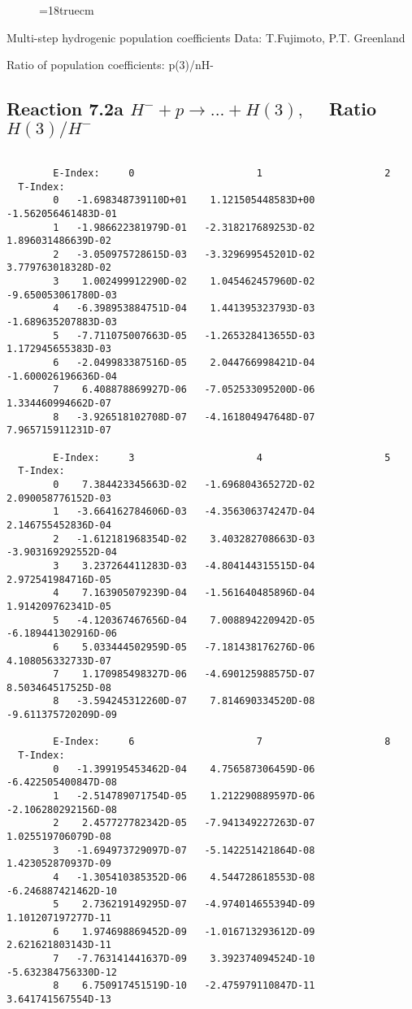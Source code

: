 \begin{figure} \label{2.2.14d}
\epsfxsize=18truecm
\end{figure}
\newpage

 Multi-step hydrogenic population coefficients
 Data: T.Fujimoto, P.T. Greenland

 Ratio of population coefficients: p(3)/nH-

\subsection{
Reaction 7.2a $ H^- + p \rightarrow ...+ H(3) , \quad  $
Ratio $H(3)/H^- $
}

\begin{verbatim}

        E-Index:     0                     1                     2
  T-Index:
        0   -1.698348739110D+01    1.121505448583D+00   -1.562056461483D-01
        1   -1.986622381979D-01   -2.318217689253D-02    1.896031486639D-02
        2   -3.050975728615D-03   -3.329699545201D-02    3.779763018328D-02
        3    1.002499912290D-02    1.045462457960D-02   -9.650053061780D-03
        4   -6.398953884751D-04    1.441395323793D-03   -1.689635207883D-03
        5   -7.711075007663D-05   -1.265328413655D-03    1.172945655383D-03
        6   -2.049983387516D-05    2.044766998421D-04   -1.600026196636D-04
        7    6.408878869927D-06   -7.052533095200D-06    1.334460994662D-07
        8   -3.926518102708D-07   -4.161804947648D-07    7.965715911231D-07

        E-Index:     3                     4                     5
  T-Index:
        0    7.384423345663D-02   -1.696804365272D-02    2.090058776152D-03
        1   -3.664162784606D-03   -4.356306374247D-04    2.146755452836D-04
        2   -1.612181968354D-02    3.403282708663D-03   -3.903169292552D-04
        3    3.237264411283D-03   -4.804144315515D-04    2.972541984716D-05
        4    7.163905079239D-04   -1.561640485896D-04    1.914209762341D-05
        5   -4.120367467656D-04    7.008894220942D-05   -6.189441302916D-06
        6    5.033444502959D-05   -7.181438176276D-06    4.108056332733D-07
        7    1.170985498327D-06   -4.690125988575D-07    8.503464517525D-08
        8   -3.594245312260D-07    7.814690334520D-08   -9.611375720209D-09

        E-Index:     6                     7                     8
  T-Index:
        0   -1.399195453462D-04    4.756587306459D-06   -6.422505400847D-08
        1   -2.514789071754D-05    1.212290889597D-06   -2.106280292156D-08
        2    2.457727782342D-05   -7.941349227263D-07    1.025519706079D-08
        3   -1.694973729097D-07   -5.142251421864D-08    1.423052870937D-09
        4   -1.305410385352D-06    4.544728618553D-08   -6.246887421462D-10
        5    2.736219149295D-07   -4.974014655394D-09    1.101207197277D-11
        6    1.974698869452D-09   -1.016713293612D-09    2.621621803143D-11
        7   -7.763141441637D-09    3.392374094524D-10   -5.632384756330D-12
        8    6.750917451519D-10   -2.475979110847D-11    3.641741567554D-13


\end{verbatim}
